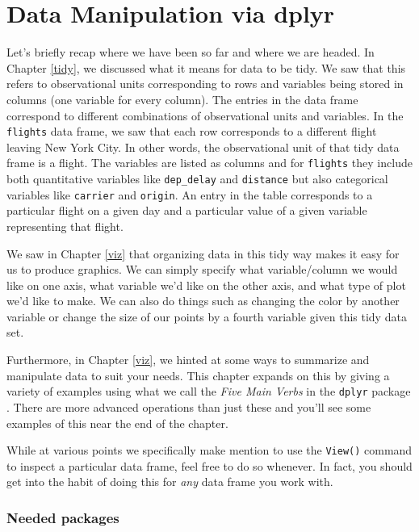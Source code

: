 \documentclass[]{tufte-book}
\begin{document}
\chapter{Data Manipulation via dplyr}\label{manip}

Let's briefly recap where we have been so far and where we are headed.
In Chapter \ref{tidy}, we discussed what it means for data to be tidy.
We saw that this refers to observational units corresponding to rows and
variables being stored in columns (one variable for every column). The
entries in the data frame correspond to different combinations of
observational units and variables. In the \texttt{flights} data frame,
we saw that each row corresponds to a different flight leaving New York
City. In other words, the observational unit of that tidy data frame is
a flight. The variables are listed as columns and for \texttt{flights}
they include both quantitative variables like \texttt{dep\_delay} and
\texttt{distance} but also categorical variables like \texttt{carrier}
and \texttt{origin}. An entry in the table corresponds to a particular
flight on a given day and a particular value of a given variable
representing that flight.

We saw in Chapter \ref{viz} that organizing data in this tidy way makes
it easy for us to produce graphics. We can simply specify what
variable/column we would like on one axis, what variable we'd like on
the other axis, and what type of plot we'd like to make. We can also do
things such as changing the color by another variable or change the size
of our points by a fourth variable given this tidy data set.

Furthermore, in Chapter \ref{viz}, we hinted at some ways to summarize
and manipulate data to suit your needs. This chapter expands on this by
giving a variety of examples using what we call the \emph{Five Main
Verbs} in the \texttt{dplyr} package \citep{R-dplyr}. There are more
advanced operations than just these and you'll see some examples of this
near the end of the chapter.

While at various points we specifically make mention to use the
\texttt{View()} command to inspect a particular data frame, feel free to
do so whenever. In fact, you should get into the habit of doing this for
\emph{any} data frame you work with.

\subsection*{Needed packages}\label{needed-packages-2}
\end{document}

